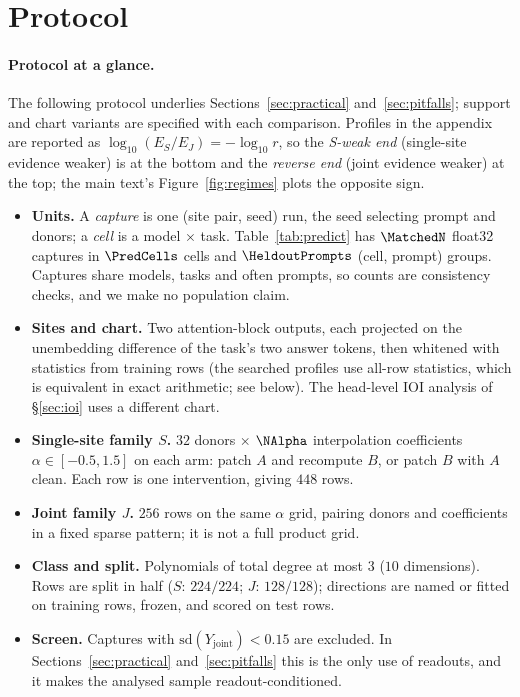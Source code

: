 \section{Protocol}
\label{app:protocol}

\paragraph{Protocol at a glance.} The following protocol underlies Sections~\ref{sec:practical} and~\ref{sec:pitfalls}; support and chart variants are
specified with each comparison. Profiles in the appendix are reported as $\log_{10}(E_S/E_J)=-\log_{10}r$, so the
\emph{S-weak end} (single-site evidence weaker) is at the bottom and the \emph{reverse end} (joint evidence weaker) at
the top; the main text's Figure~\ref{fig:regimes} plots the opposite sign.
\begin{itemize}[leftmargin=1.2em,itemsep=1pt,topsep=1pt,parsep=0pt]
\item \textbf{Units.} A \emph{capture} is one (site pair, seed) run, the seed selecting prompt and donors; a
\emph{cell} is a model $\times$ task. Table~\ref{tab:predict} has $\MatchedN$ float32 captures in $\PredCells$ cells and
$\HeldoutPrompts$ (cell, prompt) groups. Captures share models, tasks and often prompts, so counts are consistency
checks, and we make no population claim.
\item \textbf{Sites and chart.} Two attention-block outputs, each projected on the unembedding difference of the
task's two answer tokens, then whitened with statistics from training rows (the searched profiles use
all-row statistics, which is equivalent in exact arithmetic; see below). The head-level IOI analysis of
\S\ref{sec:ioi} uses a different chart.
\item \textbf{Single-site family $S$.} $32$ donors $\times$ $\NAlpha$ interpolation coefficients $\alpha\in[-0.5,1.5]$
on each arm: patch $A$ and recompute $B$, or patch $B$ with $A$ clean. Each row is one intervention, giving $448$ rows.
\item \textbf{Joint family $J$.} $256$ rows on the same $\alpha$ grid, pairing donors and coefficients in a fixed
sparse pattern; it is not a full product grid.
\item \textbf{Class and split.} Polynomials of total degree at most $3$ ($10$ dimensions). Rows are split in half
($S$: $224/224$; $J$: $128/128$); directions are named or fitted on training rows, frozen, and scored on test rows.
\item \textbf{Screen.} Captures with $\mathrm{sd}(Y_{\mathrm{joint}})<0.15$ are excluded. In
Sections~\ref{sec:practical} and~\ref{sec:pitfalls} this is the only use of readouts, and it makes the analysed sample
readout-conditioned.
\end{itemize}

